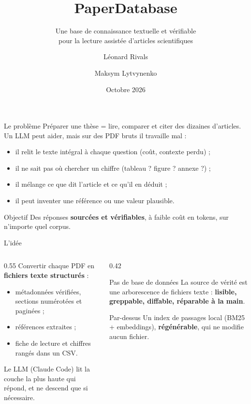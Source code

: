 \documentclass[aspectratio=169,11pt]{beamer}
\title{PaperDatabase}
\subtitle{Une base de connaissance textuelle et vérifiable\\pour la lecture assistée d'articles scientifiques}
\author{Léonard Rivals \and Maksym Lytvynenko}
\date{Octobre 2026}
\begin{document}
\maketitle

\begin{frame}{Le problème}
  Préparer une thèse = lire, comparer et citer des \alert{dizaines d'articles}.
  Un LLM peut aider, mais sur des PDF bruts il travaille mal :
  \vspace{0.6em}
  \begin{itemize}
    \item il \alert{relit le texte intégral} à chaque question (coût, contexte perdu) ;
    \item il \alert{ne sait pas où chercher} un chiffre (tableau ? figure ? annexe ?) ;
    \item il \alert{mélange} ce que dit l'article et ce qu'il en déduit ;
    \item il peut \alert{inventer} une référence ou une valeur plausible.
  \end{itemize}
  \vspace{0.6em}
  \begin{block}{Objectif}
    Des réponses \textbf{sourcées et vérifiables}, à faible coût en tokens, sur n'importe quel corpus.
  \end{block}
\end{frame}

\begin{frame}{L'idée}
  \begin{columns}[T]
    \begin{column}{0.55\textwidth}
      Convertir chaque PDF en \textbf{fichiers texte structurés} :
      \begin{itemize}
        \item métadonnées vérifiées, sections numérotées et paginées ;
        \item références extraites ;
        \item fiche de lecture et chiffres rangés dans un CSV.
      \end{itemize}
      \medskip
      Le LLM (Claude Code) lit la \alert{couche la plus haute} qui répond,
      et ne descend que si nécessaire.
    \end{column}
    \begin{column}{0.42\textwidth}
      \begin{exampleblock}{Pas de base de données}
        La source de vérité est une arborescence de fichiers texte :
        \textbf{lisible, greppable, diffable, réparable à la main}.
      \end{exampleblock}
      \begin{block}{Par-dessus}
        Un index de passages local (BM25 + embeddings), \textbf{régénérable},
        qui ne modifie aucun fichier.
      \end{block}
    \end{column}
  \end{columns}
\end{frame}
\end{document}
